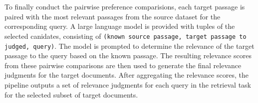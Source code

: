 \\\\
To finally conduct the pairwise preference comparisions, each target passage is paired with the most relevant passages from the source dataset for the corresponding query. A large language model is provided with tuples of the selected canidates, consisting of \texttt{(known source passage, target passage to judged, query)}. The model is prompted to determine the relevance of the target passage to the query based on the known passage. The resulting relevance scores from these pairwise comparisons are then used to generate the final relevance judgments for the target documents. After aggregating the relevance scores, the pipeline outputs a set of relevance judgments for each query in the retrieval task for the selected subset of target documents.
